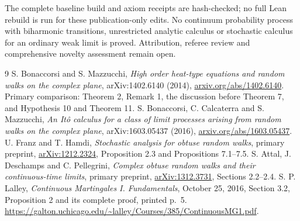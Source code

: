 \documentclass[11pt]{article}
\begin{document}
The complete baseline build and axiom receipts are hash-checked; no full
Lean rebuild is run for these publication-only edits. No continuum
probability process with biharmonic transitions, unrestricted analytic
calculus or stochastic calculus for an ordinary weak limit is proved.
Attribution, referee review and comprehensive novelty assessment remain open.
\par\endgroup

\clearpage
\begin{thebibliography}{9}
S. Bonaccorsi and S. Mazzucchi,
\emph{High order heat-type equations and random walks on the complex plane},
arXiv:1402.6140 (2014),
\href{https://arxiv.org/abs/1402.6140}{arxiv.org/abs/1402.6140}.
Primary comparison: Theorem 2, Remark 1, the discussion before Theorem 7,
and Hypothesis 10 and Theorem 11.
S. Bonaccorsi, C. Calcaterra and S. Mazzucchi,
\emph{An It\^o calculus for a class of limit processes arising from random
walks on the complex plane}, arXiv:1603.05437 (2016),
\href{https://arxiv.org/abs/1603.05437}{arxiv.org/abs/1603.05437}.
 U. Franz and T. Hamdi, \emph{Stochastic analysis for obtuse random walks}, primary preprint, \href{https://arxiv.org/abs/1212.2324}{arXiv:1212.2324}, Proposition 2.3 and Propositions 7.1--7.5.
 S. Attal, J. Deschamps and C. Pellegrini, \emph{Complex obtuse random walks and their continuous-time limits}, primary preprint, \href{https://arxiv.org/abs/1312.3731}{arXiv:1312.3731}, Sections 2.2--2.4.
 S. P. Lalley,
\emph{Continuous Martingales I. Fundamentals}, October 25, 2016,
Section 3.2, Proposition 2 and its complete proof, printed p.~5.
\url{https://galton.uchicago.edu/~lalley/Courses/385/ContinuousMG1.pdf}.
\end{thebibliography}
\end{document}
